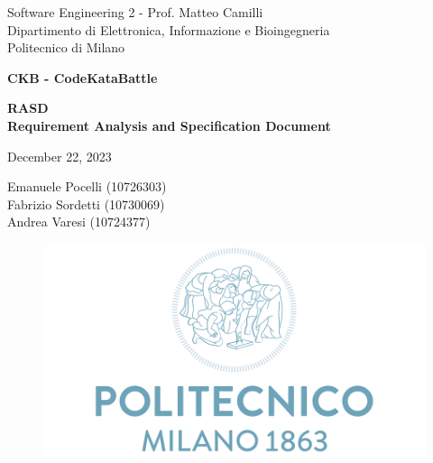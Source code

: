 \documentclass{article}
\begin{document}
\begin{titlepage}
  \centering
  {\normalsize
    Software Engineering 2 - Prof. Matteo Camilli \\
    Dipartimento di Elettronica, Informazione e Bioingegneria \\
    Politecnico di Milano \par
  }     \vspace{3cm}
  {\Huge \textbf{CKB - CodeKataBattle\\} } \vspace{1cm}
  {\large \textbf{RASD\\Requirement Analysis and Specification Document} \par} \vspace{1cm}
  {\normalsize December 22, 2023 \par} \vspace{4cm}
  {\normalsize Emanuele Pocelli (10726303) \\ Fabrizio Sordetti (10730069) \\  Andrea Varesi (10724377)\par} \vspace{4cm}
  \begin{figure}[h]
    \centering
    \includegraphics[scale=0.3]{src/poli_logo.png}
  \end{figure} \vspace{0.5cm}
\end{titlepage}


\begin{large}

\tableofcontents









\end{large}
\end{document}
